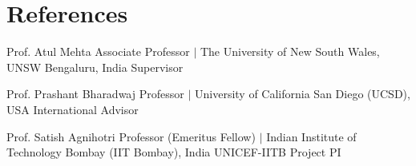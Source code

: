 \section{References}
  \CVSubHeadingListStart
    
    \CVSubheading
      {Prof. Atul Mehta}
      {}
      {Associate Professor $|$ The University of New South Wales,  UNSW Bengaluru, India}
      {Supervisor}
      \CVItemListStart
      \CVItemListEnd

    \CVSubheading
      {Prof. Prashant Bharadwaj}
      {}
      {Professor $|$ University of California San Diego (UCSD), USA}
      {International Advisor}
      \CVItemListStart
      \CVItemListEnd

    \CVSubheading
      {Prof. Satish Agnihotri}
      {}
      {Professor (Emeritus Fellow) $|$ Indian Institute of Technology Bombay (IIT Bombay), India}
      {UNICEF-IITB Project PI}
      \CVItemListStart
      \CVItemListEnd

      
  
    \CVSubHeadingListEnd